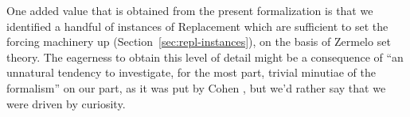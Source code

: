 One added value that is obtained from the present formalization is
that we identified a handful of instances of Replacement which are
sufficient to set the forcing machinery up
(Section~\ref{sec:repl-instances}), on the basis of Zermelo set theory.
The eagerness to obtain this level of detail might be a consequence of
“an unnatural tendency to investigate, for the most part, trivial
minutiae of the formalism” on our part, as it was put by Cohen
\cite{zbMATH02012060}, but we'd rather say that we were driven by
curiosity.

